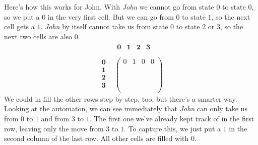 Here's how this works for John.
With \emph{John} we cannot go from state 0 to state 0, so we put a $0$ in the very first cell.
But we can go from $0$ to state $1$, so the next cell gets a $1$.
\emph{John} by itself cannot take us from state $0$ to state $2$ or $3$, so the next two cells are also $0$.
\[
    \begin{array}{cc}
        &
        \begin{array}{cccc}
            \textbf{0} &
            \textbf{1} &
            \textbf{2} &
            \textbf{3} \\
        \end{array}
        \\
        \begin{array}{cccc}
            \textbf{0} \\
            \textbf{1} \\
            \textbf{2} \\
            \textbf{3} \\
        \end{array}
        &
        \left (
            \begin{array}{cccc}
                0 & 1 & 0 & 0\\
                \phantom{0} & \phantom{0} & \phantom{0} & \phantom{0}\\
                \phantom{0} & \phantom{0} & \phantom{0} & \phantom{0}\\
                \phantom{0} & \phantom{1} & \phantom{0} & \phantom{0}\\
            \end{array}
        \right )
    \end{array}
\]
We could in fill the other rows step by step, too, but there's a smarter way.
Looking at the automaton, we can see immediately that \emph{John} can only take us from $0$ to $1$ and from $3$ to $1$.
The first one we've already kept track of in the first row, leaving only the move from $3$ to $1$.
To capture this, we just put a $1$ in the second column of the last row.
All other cells are filled with $0$.
